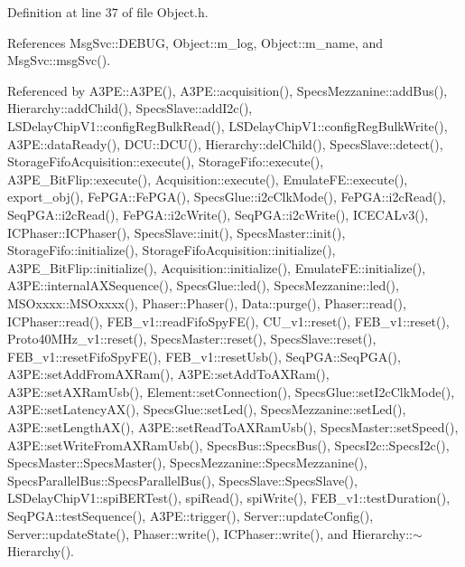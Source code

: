Definition at line 37 of file Object.\+h.



References Msg\+Svc\+::\+D\+E\+B\+UG, Object\+::m\+\_\+log, Object\+::m\+\_\+name, and Msg\+Svc\+::msg\+Svc().



Referenced by A3\+P\+E\+::\+A3\+P\+E(), A3\+P\+E\+::acquisition(), Specs\+Mezzanine\+::add\+Bus(), Hierarchy\+::add\+Child(), Specs\+Slave\+::add\+I2c(), L\+S\+Delay\+Chip\+V1\+::config\+Reg\+Bulk\+Read(), L\+S\+Delay\+Chip\+V1\+::config\+Reg\+Bulk\+Write(), A3\+P\+E\+::data\+Ready(), D\+C\+U\+::\+D\+C\+U(), Hierarchy\+::del\+Child(), Specs\+Slave\+::detect(), Storage\+Fifo\+Acquisition\+::execute(), Storage\+Fifo\+::execute(), A3\+P\+E\+\_\+\+Bit\+Flip\+::execute(), Acquisition\+::execute(), Emulate\+F\+E\+::execute(), export\+\_\+obj(), Fe\+P\+G\+A\+::\+Fe\+P\+G\+A(), Specs\+Glue\+::i2c\+Clk\+Mode(), Fe\+P\+G\+A\+::i2c\+Read(), Seq\+P\+G\+A\+::i2c\+Read(), Fe\+P\+G\+A\+::i2c\+Write(), Seq\+P\+G\+A\+::i2c\+Write(), I\+C\+E\+C\+A\+Lv3(), I\+C\+Phaser\+::\+I\+C\+Phaser(), Specs\+Slave\+::init(), Specs\+Master\+::init(), Storage\+Fifo\+::initialize(), Storage\+Fifo\+Acquisition\+::initialize(), A3\+P\+E\+\_\+\+Bit\+Flip\+::initialize(), Acquisition\+::initialize(), Emulate\+F\+E\+::initialize(), A3\+P\+E\+::internal\+A\+X\+Sequence(), Specs\+Glue\+::led(), Specs\+Mezzanine\+::led(), M\+S\+Oxxxx\+::\+M\+S\+Oxxxx(), Phaser\+::\+Phaser(), Data\+::purge(), Phaser\+::read(), I\+C\+Phaser\+::read(), F\+E\+B\+\_\+v1\+::read\+Fifo\+Spy\+F\+E(), C\+U\+\_\+v1\+::reset(), F\+E\+B\+\_\+v1\+::reset(), Proto40\+M\+Hz\+\_\+v1\+::reset(), Specs\+Master\+::reset(), Specs\+Slave\+::reset(), F\+E\+B\+\_\+v1\+::reset\+Fifo\+Spy\+F\+E(), F\+E\+B\+\_\+v1\+::reset\+Usb(), Seq\+P\+G\+A\+::\+Seq\+P\+G\+A(), A3\+P\+E\+::set\+Add\+From\+A\+X\+Ram(), A3\+P\+E\+::set\+Add\+To\+A\+X\+Ram(), A3\+P\+E\+::set\+A\+X\+Ram\+Usb(), Element\+::set\+Connection(), Specs\+Glue\+::set\+I2c\+Clk\+Mode(), A3\+P\+E\+::set\+Latency\+A\+X(), Specs\+Glue\+::set\+Led(), Specs\+Mezzanine\+::set\+Led(), A3\+P\+E\+::set\+Length\+A\+X(), A3\+P\+E\+::set\+Read\+To\+A\+X\+Ram\+Usb(), Specs\+Master\+::set\+Speed(), A3\+P\+E\+::set\+Write\+From\+A\+X\+Ram\+Usb(), Specs\+Bus\+::\+Specs\+Bus(), Specs\+I2c\+::\+Specs\+I2c(), Specs\+Master\+::\+Specs\+Master(), Specs\+Mezzanine\+::\+Specs\+Mezzanine(), Specs\+Parallel\+Bus\+::\+Specs\+Parallel\+Bus(), Specs\+Slave\+::\+Specs\+Slave(), L\+S\+Delay\+Chip\+V1\+::spi\+B\+E\+R\+Test(), spi\+Read(), spi\+Write(), F\+E\+B\+\_\+v1\+::test\+Duration(), Seq\+P\+G\+A\+::test\+Sequence(), A3\+P\+E\+::trigger(), Server\+::update\+Config(), Server\+::update\+State(), Phaser\+::write(), I\+C\+Phaser\+::write(), and Hierarchy\+::$\sim$\+Hierarchy().


